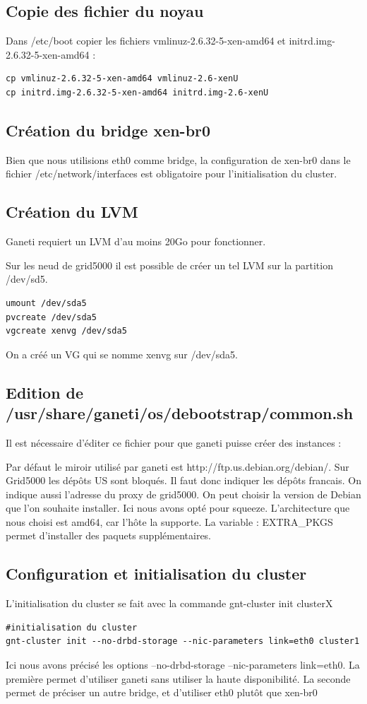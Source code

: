 \subsection {Copie des fichier du noyau}
Dans /etc/boot copier les fichiers vmlinuz-2.6.32-5-xen-amd64 et initrd.img-2.6.32-5-xen-amd64 :
\begin{lstlisting}
cp vmlinuz-2.6.32-5-xen-amd64 vmlinuz-2.6-xenU
cp initrd.img-2.6.32-5-xen-amd64 initrd.img-2.6-xenU
\end{lstlisting}

\subsection {Création du bridge xen-br0}

Bien que nous utilisions eth0 comme bridge, la configuration de xen-br0 dans le fichier /etc/network/interfaces est obligatoire pour l'initialisation du cluster. 

\subsection {Création du LVM}

Ganeti requiert un LVM d'au moins 20Go pour fonctionner.

Sur les neud de grid5000 il est possible de créer un tel LVM sur la partition /dev/sd5.
\begin{lstlisting}
umount /dev/sda5
pvcreate /dev/sda5
vgcreate xenvg /dev/sda5
\end{lstlisting}
On a créé un VG qui se nomme xenvg sur /dev/sda5.

\subsection {Edition de /usr/share/ganeti/os/debootstrap/common.sh}

Il est nécessaire d'éditer ce fichier pour que ganeti puisse créer des instances :

Par défaut le miroir utilisé par ganeti est http://ftp.us.debian.org/debian/. Sur Grid5000 les dépôts US sont bloqués. Il faut donc indiquer les dépôts francais.
On indique aussi l'adresse du proxy de grid5000.
On peut choisir la version de Debian que l'on souhaite installer. Ici nous avons opté pour squeeze.
L'architecture que nous choisi est amd64, car l'hôte la supporte.
La variable : EXTRA\_PKGS permet d'installer des paquets supplémentaires.

\subsection {Configuration et initialisation du cluster}
L'initialisation du cluster se fait avec la commande gnt-cluster init clusterX
\begin{lstlisting}
#initialisation du cluster
gnt-cluster init --no-drbd-storage --nic-parameters link=eth0 cluster1
\end{lstlisting}
Ici nous avons précisé les options --no-drbd-storage --nic-parameters link=eth0.
La première permet d'utiliser ganeti sans utiliser la haute disponibilité.
La seconde permet de préciser un autre bridge, et d'utiliser eth0 plutôt que xen-br0

